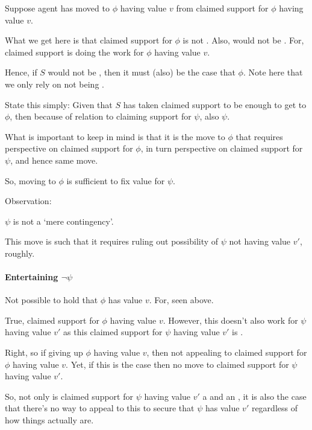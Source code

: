 \begin{note}
  Suppose agent has moved to \(\phi\) having value \(v\) from claimed support for \(\phi\) having value \(v\).

  What we get here is that claimed support for \(\phi\) is not \misled{}.
  Also, would not be \mistaken{}.
  For, claimed support is doing the work for \(\phi\) having value \(v\).


  Hence, if \(S\) would not be \mistaken{}, then it must (also) be the case that \(\phi\).
  Note here that we only rely on not being \misled{}.

  State this simply:
  Given that \(S\) has taken claimed support to be enough to get to \(\phi\), then because of relation to claiming support for \(\psi\), also \(\psi\).

  What is important to keep in mind is that it is the move to \(\phi\) that requires perspective on claimed support for \(\phi\), in turn perspective on claimed support for \(\psi\), and hence same move.

  So, moving to \(\phi\) is sufficient to fix value for \(\psi\).
\end{note}

\begin{note}
  Observation:

  \(\psi\) is not a `mere contingency'.

  This move is such that it requires ruling out possibility of \(\psi\) not having value \(v'\), roughly.
\end{note}


\paragraph{Entertaining \(\lnot\psi\)}

\begin{note}
  Not possible to hold that \(\phi\) has value \(v\).
  For, seen above.
\end{note}

\begin{note}
  True, claimed support for \(\phi\) having value \(v\).
  However, this doesn't also work for \(\psi\) having value \(v'\) as this claimed support for \(\psi\) having value \(v'\) is \expec{}.

  Right, so if giving up \(\phi\) having value \(v\), then not appealing to claimed support for \(\phi\) having value \(v\).
  Yet, if this is the case then no move to claimed support for \(\psi\) having value \(v'\).

  So, not only is claimed support for \(\psi\) having value \(v'\) a \requ{} and an \expec{}, it is also the case that there's no way to appeal to this to secure that \(\psi\) has value \(v'\) regardless of how things actually are.
\end{note}


